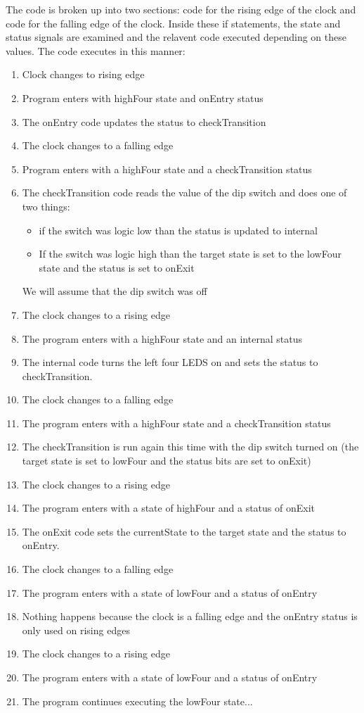 \documentclass{article}
\begin{document}
	The code is broken up into two sections: code for the rising edge of the clock and code for the falling edge of the clock. Inside these if statements, the state and status signals are examined and the relavent code executed depending on these values. The code executes in this manner:
	\begin{enumerate}
		\item Clock changes to rising edge
		\item Program enters with highFour state and onEntry status
		\item The onEntry code updates the status to checkTransition
		\item The clock changes to a falling edge
		\item Program enters with a highFour state and a checkTransition status
		\item The checkTransition code reads the value of the dip switch and does one of two things:
		\begin{itemize}
			\item if the switch was logic low than the status is updated to internal
			\item If the switch was logic high than the target state is set to the lowFour state and the status is set to onExit
		\end{itemize}
		We will assume that the dip switch was off
		\item The clock changes to a rising edge
		\item The program enters with a highFour state and an internal status
		\item The internal code turns the left four LEDS on and sets the status to checkTransition.
		\item The clock changes to a falling edge
		\item The program enters with a highFour state and a checkTransition status
		\item The checkTransition is run again this time with the dip switch turned on (the target state is set to lowFour and the status bits are set to onExit)
		\item The clock changes to a rising edge
		\item The program enters with a state of highFour and a status of onExit
		\item The onExit code sets the currentState to the target state and the status to onEntry.
		\item The clock changes to a falling edge
		\item The program enters with a state of lowFour and a status of onEntry
		\item Nothing happens because the clock is a falling edge and the onEntry status is only used on rising edges
		\item The clock changes to a rising edge
		\item The program enters with a state of lowFour and a status of onEntry
		\item The program continues executing the lowFour state...
	\end{enumerate}
	
\end{document}
